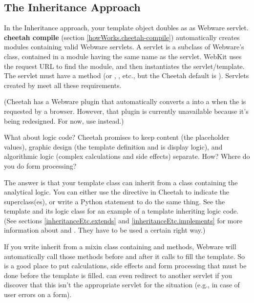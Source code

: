 \subsection{The Inheritance Approach}
\label{webware.inheritance}

In the Inheritance approach, your template object doubles as as Webware 
servlet.  {\bf cheetah compile} (section \ref{howWorks.cheetah-compile}) 
automatically creates modules containing valid Webware servlets.  A servlet is
a subclass of Webware's  class, contained in a module
having the same name as the servlet.  WebKit uses the request URL
to find the module, and then instantiates the servlet/template.  The servlet
must have a  method (or ,
, etc., but the Cheetah default is ).
Servlets created by  meet all these requirements.

(Cheetah has a Webware plugin that automatically converts a  into a  when the  is
requested by a browser.  However, that plugin is currently unavailable because
it's being redesigned.  For now, use  instead.)

What about logic code?  Cheetah promises to keep content (the placeholder
values), graphic design (the template definition and is display logic), and
algorithmic logic (complex calculations and side effects) separate.  How?
Where do you do form processing?

The answer is that your template class can inherit from a class containing
the analytical logic.  You can either use the  directive in
Cheetah to indicate the superclass(es), or write a Python 
statement to do the same thing.  See the template
 and its logic class
 for an example of a template
inheriting logic code.  (See sections \ref{inheritanceEtc.extends} and
\ref{inheritanceEtc.implements} for more information about
 and .  They have to be used a certain
right way.)

If you write inherit from a mixin class containing  and 
 methods, Webware will automatically call those methods before
and after it calls  to fill the template.  So 
 is a good place to put calculations, side effects and 
form processing that must be done before the template is filled.
 can even redirect to another servlet if you discover that this
isn't the appropriate servlet for the situation (e.g., in case of user errors
on a form).  

